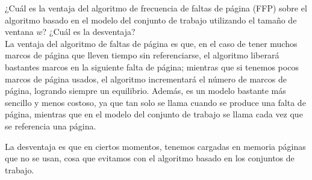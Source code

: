 \begin{ejercicio}
    ¿Cuál es la ventaja del algoritmo de frecuencia de faltas de página (FFP) sobre el algoritmo basado en el
modelo del conjunto de trabajo utilizando el tamaño de ventana $w$? ¿Cuál es la
desventaja?\\

    La ventaja del algoritmo de faltas de página es que, en el caso de tener muchos marcos de página que lleven tiempo sin referenciarse,
    el algoritmo liberará bastantes marcos en la siguiente falta de página; mientras que si tenemos pocos marcos de página usados,
    el algoritmo incrementará el número de marcos de página, logrando siempre un equilibrio.
    Además, es un modelo bastante más sencillo y menos costoso,
    ya que tan solo se llama cuando se produce una falta de página, mientras que en el
    modelo del conjunto de trabajo se llama cada vez que se referencia una página.


    La desventaja es que en ciertos momentos, tenemos cargadas en memoria páginas que no se usan,
    cosa que evitamos con el algoritmo basado en los conjuntos de trabajo.
\end{ejercicio}



